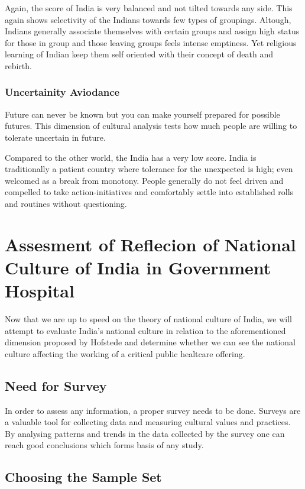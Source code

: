 \documentclass{article}
\begin{document}
Again, the score of India is very balanced and not tilted towards any side. This again shows selectivity of the Indians towards few types of groupings. Altough, Indians generally associate themselves with certain groups and assign high status for those in group and those leaving groups feels intense emptiness. Yet religious learning of Indian keep them self oriented with their concept of death and rebirth.

\subsubsection{Uncertainity Aviodance}

Future can never be known but you can make yourself prepared for possible futures. This dimension of cultural analysis tests how much people are willing to tolerate uncertain in future.

Compared to the other world, the India has a very low score. India is traditionally a patient country where tolerance for the unexpected is high; even welcomed as a break from monotony. People generally do not feel driven and compelled to take action-initiatives and comfortably settle into established rolls and routines without questioning.

\section{Assesment of Reflecion of National Culture of India in Government Hospital}

Now that we are up to speed on the theory of national culture of India, we will attempt to evaluate India's national culture in relation to the aforementioned dimension proposed by Hofstede and determine whether we can see the national culture affecting the working of a critical public healtcare offering.

\subsection{Need for Survey}

In order to assess any information, a proper survey needs to be done. Surveys are a valuable tool for collecting data and measuring cultural values and practices. By analysing patterns and trends in the data collected by the survey one can reach good conclusions which forms basis of any study.

\subsection{Choosing the Sample Set}
\end{document}
